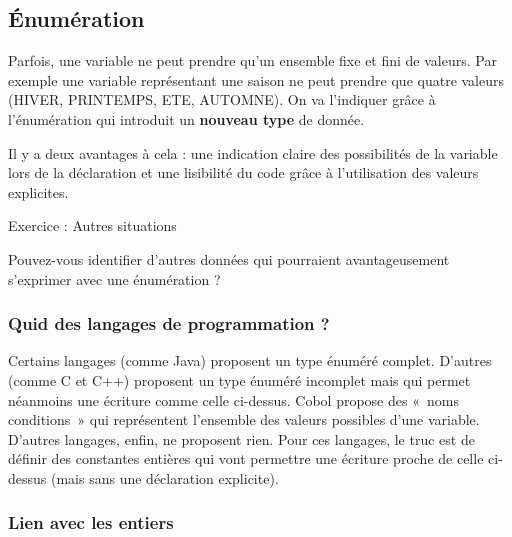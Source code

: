 
		\subsection{Énumération}

			Parfois, une variable ne peut prendre qu'un ensemble
			fixe et fini de valeurs. Par exemple une variable représentant une
			saison ne peut prendre que quatre valeurs (HIVER, PRINTEMPS, ETE,
			AUTOMNE). On va l'indiquer grâce à
			l'énumération qui introduit un \textbf{nouveau type}
			de donnée.


			Il y a deux avantages à cela : une indication claire des possibilités de
			la variable lors de la déclaration et une lisibilité du code grâce à
			l'utilisation des valeurs explicites.

			\begin{Emphase}{Exercice : Autres situations}

				Pouvez-vous identifier d'autres données qui pourraient
				avantageusement s'exprimer avec une énumération ?

			\end{Emphase}
			
			\subsubsection*{Quid des langages de programmation ?}

				Certains langages (comme Java) proposent un type énuméré complet.
				D'autres (comme C et C++) proposent un type énuméré
				incomplet mais qui permet néanmoins une écriture comme celle ci-dessus.
				Cobol propose des «~noms conditions~» qui représentent
				l'ensemble des valeurs possibles
				d'une variable. D'autres langages,
				enfin, ne proposent rien. Pour ces langages, le truc est de définir des
				constantes entières qui vont permettre une écriture proche de celle
				ci-dessus (mais sans une déclaration explicite).

			\subsubsection*{Lien avec les entiers}

